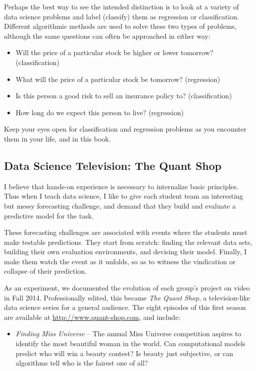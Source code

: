 \documentclass[10pt]{article}
\begin{document}
Perhaps the best way to see the intended distinction is to look at a variety of data science problems and label (classify) them as regression or classification. Different algorithmic methods are used to solve these two types of problems, although the same questions can often be approached in either way:

\begin{itemize}
  \item Will the price of a particular stock be higher or lower tomorrow? (classification)
  \item What will the price of a particular stock be tomorrow? (regression)
  \item Is this person a good risk to sell an insurance policy to? (classification)
  \item How long do we expect this person to live? (regression)
\end{itemize}

Keep your eyes open for classification and regression problems as you encounter them in your life, and in this book.

\subsection{Data Science Television: The Quant Shop}
I believe that hands-on experience is necessary to internalize basic principles. Thus when I teach data science, I like to give each student team an interesting but messy forecasting challenge, and demand that they build and evaluate a predictive model for the task.

These forecasting challenges are associated with events where the students must make testable predictions. They start from scratch: finding the relevant data sets, building their own evaluation environments, and devising their model. Finally, I make them watch the event as it unfolds, so as to witness the vindication or collapse of their prediction.

As an experiment, we documented the evolution of each group's project on video in Fall 2014. Professionally edited, this became \textit{The Quant Shop}, a television-like data science series for a general audience. The eight episodes of this first season are available at \href{http://www.quant-shop.com}{http://www.quant-shop.com}, and include:

\begin{itemize}
  \item \textit{Finding Miss Universe} – The annual Miss Universe competition aspires to identify the most beautiful woman in the world. Can computational models predict who will win a beauty contest? Is beauty just subjective, or can algorithms tell who is the fairest one of all?
\end{itemize}
\end{document}
